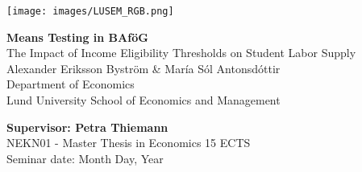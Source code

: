 
    \texttt{[image: images/LUSEM\_RGB.png]} %

\vspace{2cm}
    \begin{center}       
        \vspace*{2cm}
        {\LARGE {\textbf{Means Testing in BAföG}  \\
        The Impact of Income Eligibility Thresholds on Student Labor Supply
        }} \\
        \vspace{1cm}
        \Large{Alexander Eriksson Byström \& María Sól Antonsdóttir} \normalsize{\\ Department of Economics \\ Lund University School of Economics and Management}
    \end{center}
    \vspace{2cm}

\vfill
\noindent 
\textbf{Supervisor: Petra Thiemann} \\ 
NEKN01 - Master Thesis in Economics 15 ECTS \\ 
Seminar date: Month Day, Year
\thispagestyle{empty}

\newpage
\tableofcontents
\thispagestyle{empty}
